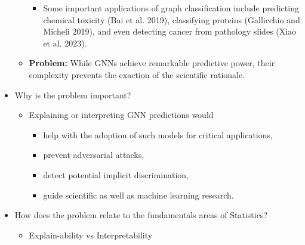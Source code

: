 \documentclass[
  11pt,
  letterpaper,
]{article}
\providecommand{\tightlist}{%
  \setlength{\itemsep}{0pt}\setlength{\parskip}{0pt}}\usepackage{longtable,booktabs,array}
\begin{document}
\begin{itemize}
\begin{itemize}
    \begin{itemize}
    \tightlist
    \item
      Some important applications of graph classification include
      predicting chemical toxicity (Bai et al. 2019), classifying
      proteins (Gallicchio and Micheli 2019), and even detecting cancer
      from pathology slides (Xiao et al. 2023).
    \end{itemize}
  \item
    \textbf{Problem:} While GNNs achieve remarkable predictive power,
    their complexity prevents the exaction of the scientific rationale.
  \end{itemize}
\item
  Why is the problem important?

  \begin{itemize}
  \tightlist
  \item
    Explaining or interpreting GNN predictions would

    \begin{itemize}
    \tightlist
    \item
      help with the adoption of such models for critical applications,
    \item
      prevent adversarial attacks,
    \item
      detect potential implicit discrimination,
    \item
      guide scientific as well as machine learning research.
    \end{itemize}
  \end{itemize}
\item
  How does the problem relate to the fundamentals areas of Statistics?

  \begin{itemize}
  \item
    Explain-ability vs Interpretability


\end{itemize}
\end{itemize}
\end{document}
